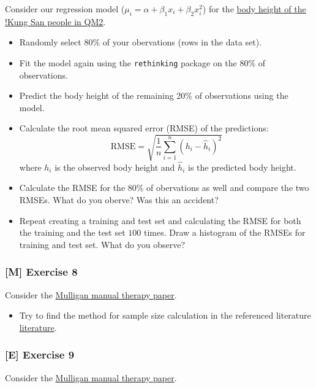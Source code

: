 \documentclass[
]{article}
\providecommand{\tightlist}{%
  \setlength{\itemsep}{0pt}\setlength{\parskip}{0pt}}
\begin{document}
Consider our regression model
(\(\mu_i = \alpha + \beta_1 x_i + \beta_2 x_i^2\)) for the
\href{https://jdegenfellner.github.io/Script_QM2_ZHAW/multiple-linear-regression.html\#adding_transformed_predictor_bayes}{body
height of the !Kung San people in QM2}.

\begin{itemize}
\tightlist
\item
  Randomly select 80\% of your obervations (rows in the data set).
\item
  Fit the model again using the \texttt{rethinking} package on the 80\%
  of observations.
\item
  Predict the body height of the remaining 20\% of observations using
  the model.
\item
  Calculate the root mean squared error (RMSE) of the predictions:
  \[ \text{RMSE} = \sqrt{\frac{1}{n}\sum_{i=1}^n (h_i - \hat{h}_i)^2}\]
  where \(h_i\) is the observed body height and \(\hat{h}_i\) is the
  predicted body height.
\item
  Calculate the RMSE for the 80\% of obervations as well and compare the
  two RMSEs. What do you oberve? Was this an accident?
\item
  Repeat creating a training and test set and calculating the RMSE for
  both the training and the test set \(100\) times. Draw a histogram of
  the RMSEs for training and test set. What do you observe?
\end{itemize}

\subsubsection{{[}M{]} Exercise 8}\label{exercise8_LMM}

Consider the \hyperref[mulligan]{Mulligan manual therapy paper}.

\begin{itemize}
\tightlist
\item
  Try to find the method for sample size calculation in the referenced
  literature
  \href{https://journals.sagepub.com/doi/epub/10.1177/0333102417738202}{literature}.
\end{itemize}

\subsubsection{{[}E{]} Exercise 9}\label{exercise9_LMM}

Consider the \hyperref[mulligan]{Mulligan manual therapy paper}.
\end{document}
